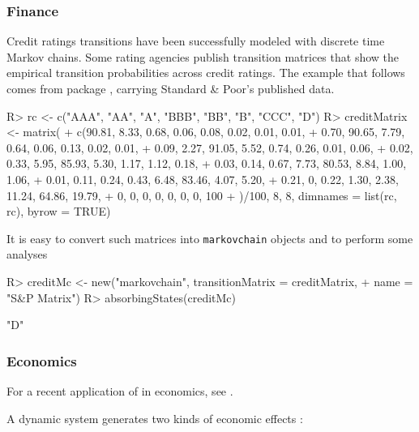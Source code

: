 \documentclass[
  nojss]{jss}
\begin{document}
\subsubsection{Finance}\label{fin:fin}

Credit ratings transitions have been successfully modeled with discrete time Markov chains. Some rating agencies publish transition matrices that show the empirical transition probabilities across credit ratings. The example that follows
comes from   package \citep{CreditMetricsR},
carrying Standard \& Poor's published data.

\begin{CodeChunk}
\begin{CodeInput}
R> rc <- c("AAA", "AA", "A", "BBB", "BB", "B", "CCC", "D")
R> creditMatrix <- matrix(
+   c(90.81, 8.33, 0.68, 0.06, 0.08, 0.02, 0.01, 0.01,
+     0.70, 90.65, 7.79, 0.64, 0.06, 0.13, 0.02, 0.01,
+     0.09, 2.27, 91.05, 5.52, 0.74, 0.26, 0.01, 0.06,
+     0.02, 0.33, 5.95, 85.93, 5.30, 1.17, 1.12, 0.18,
+     0.03, 0.14, 0.67, 7.73, 80.53, 8.84, 1.00, 1.06,
+     0.01, 0.11, 0.24, 0.43, 6.48, 83.46, 4.07, 5.20,
+     0.21, 0, 0.22, 1.30, 2.38, 11.24, 64.86, 19.79,
+     0, 0, 0, 0, 0, 0, 0, 100
+    )/100, 8, 8, dimnames = list(rc, rc), byrow = TRUE)
\end{CodeInput}
\end{CodeChunk}

It is easy to convert such matrices into \texttt{markovchain} objects and to perform some analyses

\begin{CodeChunk}
\begin{CodeInput}
R> creditMc <- new("markovchain", transitionMatrix = creditMatrix, 
+                 name = "S&P Matrix")
R> absorbingStates(creditMc)
\end{CodeInput}
\begin{CodeOutput}
[1] "D"
\end{CodeOutput}
\end{CodeChunk}

\subsubsection{Economics}\label{fin:ec}

For a recent application of  in economics, see \cite{manchesterR}.

A dynamic system generates two kinds of economic effects \citep{bardPpt}:
\end{document}
